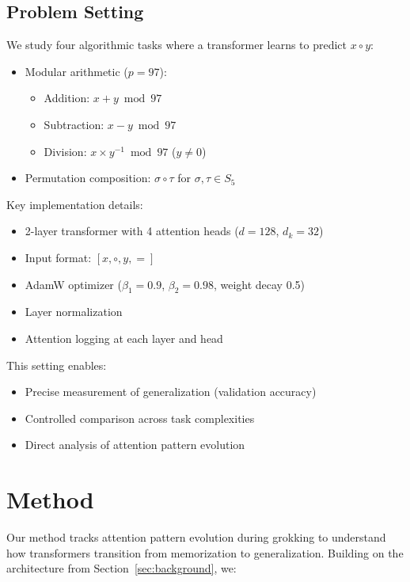 \documentclass{article} %
\begin{document}
\subsection{Problem Setting}
We study four algorithmic tasks where a transformer learns to predict $x \circ y$:

\begin{itemize}
    \item Modular arithmetic ($p=97$):
    \begin{itemize}
        \item Addition: $x + y \bmod 97$
        \item Subtraction: $x - y \bmod 97$
        \item Division: $x \times y^{-1} \bmod 97$ ($y \neq 0$)
    \end{itemize}
    \item Permutation composition: $\sigma \circ \tau$ for $\sigma,\tau \in S_5$
\end{itemize}

Key implementation details:
\begin{itemize}
    \item 2-layer transformer with 4 attention heads ($d=128$, $d_k=32$)
    \item Input format: $[x, \circ, y, =]$
    \item AdamW optimizer ($\beta_1=0.9$, $\beta_2=0.98$, weight decay 0.5)
    \item Layer normalization \citep{ba2016layer}
    \item Attention logging at each layer and head
\end{itemize}

This setting enables:
\begin{itemize}
    \item Precise measurement of generalization (validation accuracy)
    \item Controlled comparison across task complexities
    \item Direct analysis of attention pattern evolution
\end{itemize}

\section{Method}
\label{sec:method}

Our method tracks attention pattern evolution during grokking to understand how transformers transition from memorization to generalization. Building on the architecture from Section~\ref{sec:background}, we:
\end{document}
